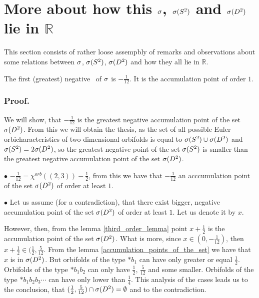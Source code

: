 


\section{More about how this ${\sigma}$, ${{\sigma}(S^2)}$ and ${{\sigma}(D^2)}$ lie in $\mathbb{R}$}
This section consists of rather loose assempbly of remarks and observations about some 
relations between ${\sigma}$, ${{\sigma}(S^2)}$, ${{\sigma}(D^2)}$ and how they all lie in $\mathbb{R}$.
\begin{observation}
The first (greatest) negative \apots\ of ${\sigma}$ is 
$-\frac{1}{12}$. It is the accumulation point of order $1$. 
\end{observation}
\subsubsection{Proof.} 

We will show, that $-\frac{1}{12}$ is the greatest negative accumulation point of the set ${{\sigma}(D^2)}$. 
From this we will obtain the thesis, as the set of all possible Euler orbicharacteristics 
of two-dimensional orbifolds is equal to ${{\sigma}(S^2)} \cup {{\sigma}(D^2)}$ and ${{\sigma}(S^2)} = 2{{\sigma}(D^2)}$, so 
the greatest negative point of the set ${{\sigma}(S^2)}$ is smaller than the greatest negative accumulation 
point of the set ${{\sigma}(D^2)}$. 

$\bullet$ $-\frac{1}{12}=\chi^{orb}((2,3))-\frac{1}{2}$, from this we have that $-\frac{1}{12}$ 
an acccumulation point of the set ${{\sigma}(D^2)}$ of order at least $1$. 

$\bullet$ Let us assume (for a contradiction), that there exist bigger, negative 
accumulation point of the set ${{\sigma}(D^2)}$ of order at least $1$. Let us denote it by $x$. 

However, then, from the lemma \ref{third_order_lemma} point $x+\frac{1}{2}$ is the accumulation 
point of the set ${{\sigma}(D^2)}$. What is more, since $x\in (0, -\frac{1}{12})$, then $x+\frac{1}{2} 
\in (\frac{1}{2}, \frac{5}{12}$. From the lemma \ref{accumulation_points_of_the_set} we 
have that $x$ is in ${{\sigma}(D^2)}$. But orbifolds of the type $\ast b_1$ can have \Eoc only greater or 
equal $\frac{1}{2}$. Orbifolds of the type $\ast b_1b_2$ can only have \Eoc $\frac{1}{2}$, 
$\frac{5}{12}$ and some smaller. Orbifolds of the type $\ast b_1b_2b_3\cdots$ can have \Eoc only 
lower than $\frac{1}{4}$. This analysis of the cases leads us to the conclusion, that 
$(\frac{1}{2},\frac{5}{12})\cap {{\sigma}(D^2)}=\emptyset$ and to the contradiction. 

